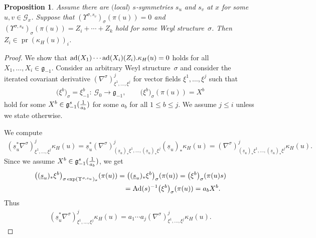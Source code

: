 \documentclass[10pt,a4paper]{amsart}
\newcommand{\ka}{\kappa}
\newcommand{\si}{\sigma}
\newcommand{\un}{\underline}
\newcommand{\ba}{\mathcal{G}}
\newcommand{\fg}{\mathfrak g}
\newcommand{\Ad}{{\rm Ad}}
\newcommand{\U}{\Upsilon}
\newcommand{\ad}{{\rm ad}}
\numberwithin{equation}{section}
\newtheorem{Proposition}[Theorem]{Proposition}
 { \theoremstyle{definition}
\newtheorem{Definition}[Theorem]{Definition}
\newtheorem{Example}[Theorem]{Example}
\newtheorem{Remark}[Theorem]{Remark} }
\begin{document}
\begin{Proposition} \label{cor-ws}
Assume there are $($local$)$ $s$-symmetries $s_u$ and $s_v$ at $x$ for some $u,v\in \ba_x$. Suppose that $(\U^{\si,s_v})_\si(\pi(u))=0$
and $(\U^{\si,s_u})_\si(\pi(u))=Z_i+\cdots+Z_k$ hold for some Weyl structu\-re~$\si$. Then $Z_i\in \operatorname{pr}(\kappa_H(u))_i$.
\end{Proposition}
\begin{proof}
We show that $\ad(X_1)\cdots \ad(X_i)(Z_i).\kappa_H(u)=0$ holds for all $X_1,\dots, X_i\in\fg_{-1}$. Consider an arbitrary Weyl structure~$\si$ and consider the iterated covariant derivative $(\nabla^\si)^j_{\xi^1,\dots,\xi^j}$ for vector f\/ields $\xi^1,\dots,\xi^j$ such that
\begin{gather*}\big(\xi^b\big)_\si=\xi^b_{-1}\colon \ \ba_0\to \fg_{-1},\qquad
\big(\xi^b\big)_\si(\pi(u))=X^b\end{gather*} hold for some $X^b\in \fg_{-1}^s( {1 \over a_b})$ for some $a_b$ for all $1\leq b \leq j$. We assume $j\leq i$ unless we state otherwise.

We compute
\begin{gather*}
(\un s_u^*\nabla^\si)^j_{\xi^1,\dots,\xi^j} \ka_H(u)= \un s_u^*(\nabla^\si)^j_{(\un s_u)_*\xi^1,\dots,(\un s_u)_*\xi^j}(\un s_u)_*\ka_H(u)
=(\nabla^\si)^j_{(\un s_u)_*\xi^1,\dots,(\un s_u)_*\xi^j}\ka_H(u).
\end{gather*}
Since we assume $X^b\in \fg_{-1}^s({1 \over a_b})$, we get
\begin{gather*}
\big((\un s_u)_*\xi^b\big)_{\si \exp(\U^{\si,s_u})_\si}(\pi(u))=\big((\un s_u)_*\xi^b\big)_{\si}(\pi(u))=\big(\xi^b\big)_\si(\pi(u)s)\\
\hphantom{\big((\un s_u)_*\xi^b\big)_{\si \exp(\U^{\si,s_u})_\si}(\pi(u))}{}=\Ad(s)^{-1}\big(\xi^b\big)_\si(\pi(u))=a_bX^b.
\end{gather*}
Thus
\begin{gather}\label{form-act}
(\un s_u^*\nabla^\si)^j_{\xi^1,\dots,\xi^j} \ka_H(u)=a_1\cdots a_j(\nabla^\si)^j_{\xi^1,\dots,\xi^j} \ka_H(u).
\end{gather}


\end{proof}
\end{document}

